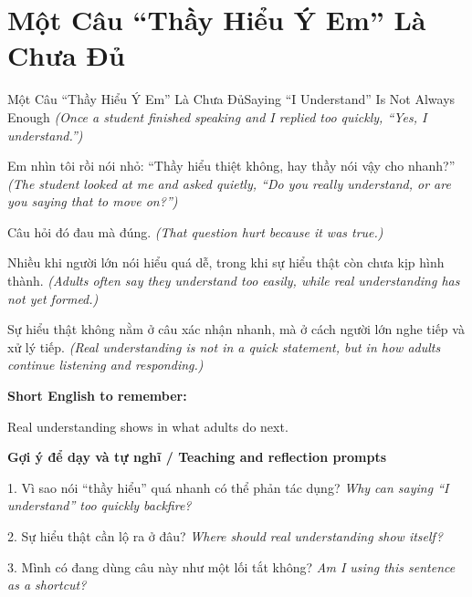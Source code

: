 \section{Một Câu “Thầy Hiểu Ý Em” Là Chưa Đủ}
\begin{truyen}{Một Câu “Thầy Hiểu Ý Em” Là Chưa Đủ}{Saying “I Understand” Is Not Always Enough}
\textit{(Once a student finished speaking and I replied too quickly, “Yes, I understand.”)}

Em nhìn tôi rồi nói nhỏ: “Thầy hiểu thiệt không, hay thầy nói vậy cho nhanh?”
\textit{(The student looked at me and asked quietly, “Do you really understand, or are you saying that to move on?”)}

Câu hỏi đó đau mà đúng.
\textit{(That question hurt because it was true.)}

Nhiều khi người lớn nói hiểu quá dễ, trong khi sự hiểu thật còn chưa kịp hình thành.
\textit{(Adults often say they understand too easily, while real understanding has not yet formed.)}

\end{truyen}

\begin{baihoc}
Sự hiểu thật không nằm ở câu xác nhận nhanh, mà ở cách người lớn nghe tiếp và xử lý tiếp.
\textit{(Real understanding is not in a quick statement, but in how adults continue listening and responding.)}
\end{baihoc}

\begin{ghinhoanh}
\textbf{Short English to remember:}

Real understanding shows in what adults do next.

\end{ghinhoanh}

\begin{tuhocnhanh}
\textbf{Gợi ý để dạy và tự nghĩ / Teaching and reflection prompts}

1. Vì sao nói “thầy hiểu” quá nhanh có thể phản tác dụng? \textit{Why can saying “I understand” too quickly backfire?}

2. Sự hiểu thật cần lộ ra ở đâu? \textit{Where should real understanding show itself?}

3. Mình có đang dùng câu này như một lối tắt không? \textit{Am I using this sentence as a shortcut?}
\end{tuhocnhanh}
